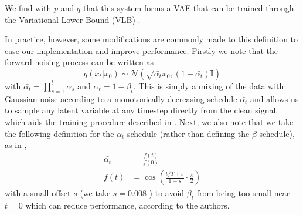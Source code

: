 We find with $p$ and $q$ that this system forms a VAE that can be trained through the Variational Lower Bound (VLB) \cite{kingma2022_VAE}.

In practice, however, some modifications are commonly made to this definition to ease our implementation and improve performance.
Firstly we note that the forward noising process can be written as
\begin{equation}
    \label{eq:direct_noising_latents}
    q(x_t|x_0) \sim \mathcal{N}(\sqrt{\bar{\alpha_t}}x_0, (1-\bar{\alpha_t})\mathbf{I})
\end{equation}
with $\bar{\alpha_t} = \prod_{s=1}^t \alpha_s$ and $\alpha_t = 1 - \beta_t$. This is simply a mixing of the data with Gaussian noise according to a monotonically decreasing schedule $\bar{\alpha_t}$ and allows us to sample any latent variable at any timestep directly from the clean signal, which aids the training procedure described in . Next, we also note that we take the following definition for the $\bar{\alpha_t}$ schedule (rather than defining the $\beta$ schedule), as in \cite{improved_diffusion},
\begin{equation}
    \begin{aligned}
    \bar{\alpha_t} &= \frac{f(t)}{f(0)} \\
    f(t) &= \cos \left( \frac{t/T + s}{1 + s} \cdot \frac{\pi}{2} \right)
    \end{aligned}
\end{equation}
with a small offset $s$ (we take $s=0.008$ \cite{improved_diffusion}) to avoid $\beta_t$ from being too small near $t=0$ which can reduce performance, according to the authors.

